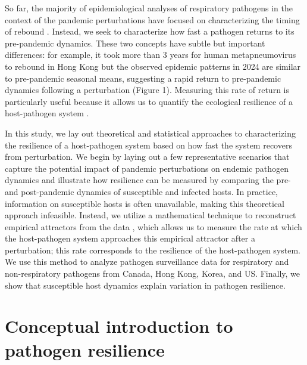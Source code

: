 \documentclass[12pt]{article}
\newcommand{\comment}{\showcomment}
\newcommand{\showcomment}[3]{\textcolor{#1}{\textbf{[#2: }\textsl{#3}\textbf{]}}}
\newcommand{\swp}[1]{\comment{magenta}{SWP}{#1}}
\begin{document}
So far, the majority of epidemiological analyses of respiratory pathogens in the context of the pandemic perturbations have focused on characterizing the timing of rebound \citep{baker2020impact,eden2022off,perofsky2024impacts}.
Instead, we seek to characterize how fast a pathogen returns to its pre-pandemic dynamics.
These two concepts have subtle but important differences: 
for example, it took more than 3 years for human metapneumovirus to rebound in Hong Kong but the observed epidemic patterns in 2024 are similar to pre-pandemic seasonal means, suggesting a rapid return to pre-pandemic dynamics following a perturbation (Figure 1).
Measuring this rate of return is particularly useful because it allows us to quantify the ecological resilience of a host-pathogen system \citep{pimm1979structure, neubert1997alternatives,gunderson2000ecological,dakos2022ecological}.

In this study, we lay out theoretical and statistical approaches to characterizing the resilience of a host-pathogen system based on how fast the system recovers from perturbation.
We begin by laying out a few representative scenarios that capture the potential impact of pandemic perturbations on endemic pathogen dynamics and illustrate how resilience can be measured by comparing the pre- and post-pandemic dynamics of susceptible and infected hosts.
In practice, information on susceptible hosts is often unavailable, making this theoretical approach infeasible.
Instead, we utilize a mathematical technique to reconstruct empirical attractors from the data \citep{takens2006detecting}, which allows us to measure the rate at which the host-pathogen system approaches this empirical attractor after a perturbation;
this rate corresponds to the resilience of the host-pathogen system.
We use this method to analyze pathogen surveillance data for respiratory and non-respiratory pathogens from Canada, Hong Kong, Korea, and US.
Finally, we show that susceptible host dynamics explain variation in pathogen resilience.
 
\section*{Conceptual introduction to pathogen resilience}
\end{document}
